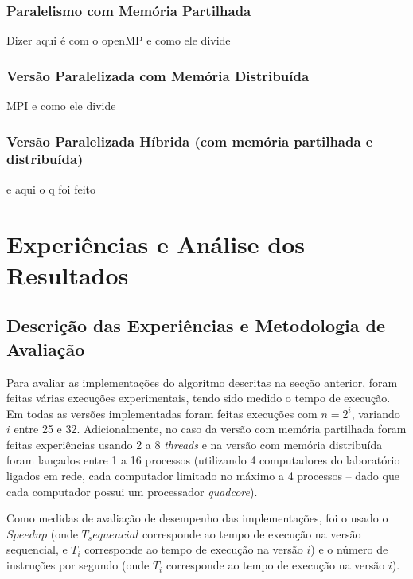\documentclass[a4paper]{article}
\begin{document}
\subsubsection{Paralelismo com Memória Partilhada}
 
Dizer aqui é com o openMP e como ele divide
 
\subsubsection{Versão Paralelizada com Memória Distribuída}
 
MPI e como ele divide
 
\subsubsection{Versão Paralelizada Híbrida (com memória partilhada e distribuída)}
 
e aqui o q foi feito
 
\section{Experiências e Análise dos Resultados}
 
\subsection{Descrição das Experiências e Metodologia de Avaliação}
 
 
 
Para avaliar as implementações do algoritmo descritas na secção anterior, foram feitas várias execuções experimentais, tendo sido medido o tempo de execução.
Em todas as versões implementadas foram feitas execuções com $n = 2^i$, variando $i$ entre 25 e 32.
Adicionalmente, no caso da versão com memória partilhada foram feitas experiências usando 2 a 8 \textit{threads} e na versão com memória distribuída foram lançados entre 1 a 16 processos (utilizando 4 computadores do laboratório ligados em rede, cada computador limitado no máximo a 4 processos -- dado que cada computador possui um processador \textit{quadcore}).
 
Como medidas de avaliação de desempenho das implementações, foi o usado o $Speedup$ (onde $T_sequencial$ corresponde ao tempo de execução na versão sequencial, e $T_i$ corresponde ao tempo de execução na versão $i$) e o número de instruções por segundo (onde $T_i$ corresponde ao tempo de execução na versão $i$).
 
\end{document}
